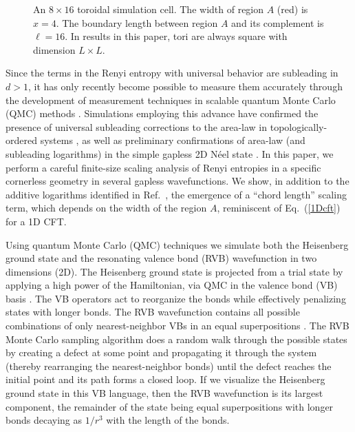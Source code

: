 \documentclass[prl,aps,twocolumn,floatfix,amsmath,amssymb,superscriptaddress,tightenlines]{revtex4}
\begin{document}
 \begin{figure}[ht]
   \begin{center}
   \end{center}
   \caption{An $8 \times 16$ toroidal simulation cell.  The width of region $A$ (red) is $x=4$.  The boundary length between region $A$ and its complement is $\ell = 16$.  In results in this paper, tori are always square with dimension $L \times L$. }
   \label{fig:torus}
 \end{figure}
 
Since the terms in the Renyi entropy with
universal behavior are subleading in $d>1$, it has only recently become
possible to measure them accurately through the development of measurement
techniques in scalable quantum Monte
Carlo (QMC) methods \cite{swap,XXZ}.  Simulations employing this advance
have confirmed the presence of universal subleading corrections to the
area-law in topologically-ordered systems \cite{isakov}, as well as preliminary
confirmations of area-law (and subleading logarithms) in the simple
gapless 2D N\'eel state \cite{HeisLog}. %
In this paper, we perform a careful
finite-size scaling analysis of Renyi entropies in a specific
cornerless geometry in several gapless wavefunctions.  We show, in
addition to the additive logarithms identified in Ref.~\cite{HeisLog},
the emergence of a ``chord length'' scaling term, which depends on the
width of the region $A$, reminiscent of Eq.~(\ref{1Dcft}) for a 1D
CFT.

Using quantum Monte Carlo (QMC) techniques we simulate both the
Heisenberg ground state and the resonating valence bond (RVB)
wavefunction in two dimensions (2D).  The Heisenberg ground state is
projected from a trial state by applying a high power of the
Hamiltonian, via QMC in the valence bond (VB)
basis \cite{Sandvik}. The VB operators act to reorganize the
bonds while effectively penalizing states with longer bonds.  The RVB
wavefunction contains all possible combinations of only
nearest-neighbor VBs in an equal superpositions \cite{RVB1,RVB2}.  The RVB 
Monte Carlo sampling
algorithm does a random walk through the possible states by creating a
defect at some point and propagating it through the system (thereby
rearranging the nearest-neighbor bonds) until the defect reaches the
initial point and its path forms a closed loop.
If we visualize the Heisenberg ground state in this VB language, then the RVB wavefunction is its largest component, the remainder of the state being equal superpositions with longer bonds decaying as $1/r^3$ \cite{Sandvik} with the length of the bonds.
\end{document}
